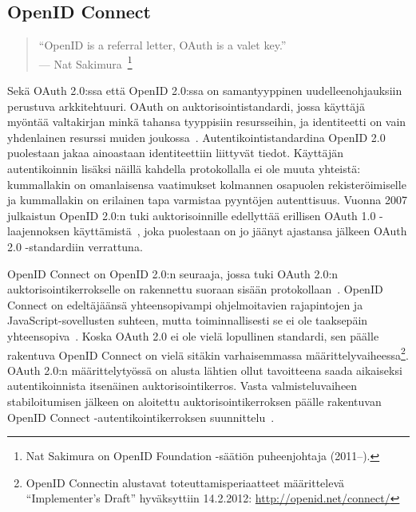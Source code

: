 \documentclass[finnish,gradu]{tktltiki}
\begin{document}


  \newpage
  \subsection{OpenID Connect} %
  \label{sub:openid_connect}

  \begin{quote}
    ``OpenID is a referral letter, OAuth is a valet key.''
    \\--- Nat Sakimura~\cite{sakimura_dummydiff_oauth_openid_2011}\footnote{Nat Sakimura on OpenID Foundation -säätiön puheenjohtaja (2011--).}
  \end{quote}

  Sekä OAuth 2.0:ssa että OpenID 2.0:ssa on samantyyppinen uudelleenohjauksiin perustuva arkkitehtuuri. OAuth on auktorisointistandardi, jossa käyttäjä myöntää valtakirjan minkä tahansa tyyppisiin resursseihin, ja identiteetti on vain yhdenlainen resurssi muiden joukossa~\cite{sakimura_dummydiff_oauth_openid_2011}. Autentikointistandardina OpenID 2.0 puolestaan jakaa ainoastaan identiteettiin liittyvät tiedot. Käyttäjän autentikoinnin lisäksi näillä kahdella protokollalla ei ole muuta yhteistä: kummallakin on omanlaisensa vaatimukset kolmannen osapuolen rekisteröimiselle ja kummallakin on erilainen tapa varmistaa pyyntöjen autenttisuus. Vuonna 2007 julkaistun OpenID 2.0:n tuki auktorisoinnille edellyttää erillisen OAuth 1.0 -laajennoksen käyttämistä~\cite{openid_2.0_oauth_hybrid_2009}, joka puolestaan on jo jäänyt ajastansa jälkeen OAuth 2.0 -standardiin verrattuna.

  OpenID Connect on OpenID 2.0:n seuraaja, jossa tuki OAuth 2.0:n auktorisointikerrokselle on rakennettu suoraan sisään protokollaan~\cite{openid_connect_specification_2012}. OpenID Connect on edeltäjäänsä yhteensopivampi ohjelmoitavien rajapintojen ja JavaScript-sovellusten suhteen, mutta  toiminnallisesti se ei ole taaksepäin yhteensopiva~\cite{sakimura_openid_connect_scopes_2011}. Koska OAuth 2.0 ei ole vielä lopullinen standardi, sen päälle rakentuva OpenID Connect on vielä sitäkin varhaisemmassa määrittelyvaiheessa\footnote{
  OpenID Connectin alustavat toteuttamisperiaatteet määrittelevä ``Implementer's Draft'' hyväksyttiin 14.2.2012: \url{http://openid.net/connect/}
  }. OAuth 2.0:n määrittelytyössä on alusta lähtien ollut tavoitteena saada aikaiseksi autentikoinnista itsenäinen auktorisointikerros. Vasta valmisteluvaiheen stabiloitumisen jälkeen on aloitettu auktorisointikerroksen päälle rakentuvan OpenID Connect -autentikointikerroksen suunnittelu~\cite{recordon_oauth20_initial_2010, shepard_oauth_facebook_2010}.
\end{document}
